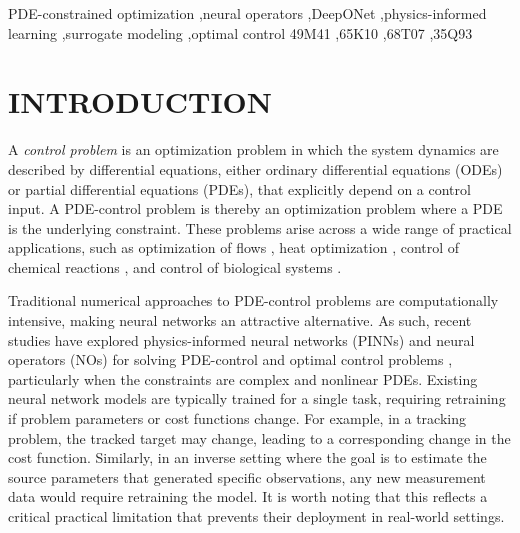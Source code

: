 \documentclass[final,1p,times]{elsarticle}
\theoremstyle{plain} %
\theoremstyle{definition} %
\theoremstyle{remark} %
\begin{document}
\begin{frontmatter}
\begin{keyword}
PDE-constrained optimization \sep neural operators \sep DeepONet \sep physics-informed learning \sep surrogate modeling \sep optimal control
\MSC[2020] 49M41 \sep 65K10 \sep 68T07 \sep 35Q93
\end{keyword}

\end{frontmatter}



\section{INTRODUCTION}

A \textit{control problem} is an optimization problem in which the system dynamics are described by differential equations, either ordinary differential equations (ODEs) or partial differential equations (PDEs), that explicitly depend on a control input. A PDE-control problem is thereby an optimization problem where a PDE is the underlying constraint. These problems arise across a wide range of practical applications, such as optimization of flows \cite{ManservisiMenghini2016_CAMWA,CasasKunisch2019_SIAMJCO},
heat optimization \cite{ReinMohringDammKlar2020_DHN,KrugMehrmannSchmidt2020_DHN},
control of chemical reactions \cite{SeymenYucelKarasozen2014_DCR,CasasRyllTroeltzsch2018_RD},
and control of biological systems \cite{BongartiParkinsonWang2025_SIRRD,Yin2023optimal}.


Traditional numerical approaches to PDE-control problems are computationally intensive, making neural networks an attractive alternative. As such, recent studies have explored physics-informed neural networks (PINNs) and neural operators (NOs) for solving PDE-control and optimal control problems \cite{Molawi2023,verma2024neural,Alla2024,Tomasetto2024,Song2023admm}, particularly when the constraints are complex and nonlinear PDEs. Existing neural network models are typically trained for a single task, requiring retraining if problem parameters or cost functions change. For example, in a tracking problem, the tracked target may change, leading to a corresponding change in the cost function. Similarly, in an inverse setting where the goal is to estimate the source parameters that generated specific observations, any new measurement data would require retraining the model. It is worth noting that this reflects a critical practical limitation that prevents their deployment in real-world settings. 
\end{document}
